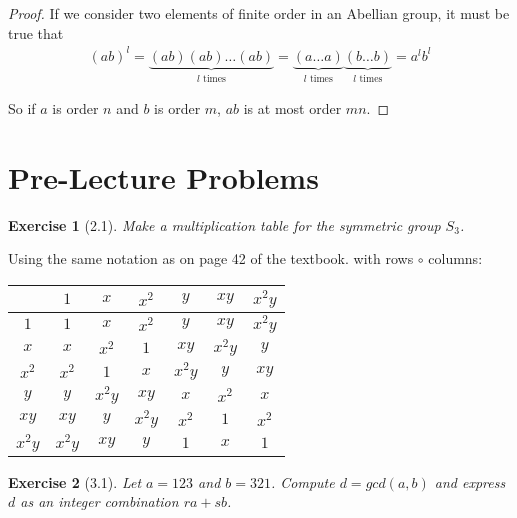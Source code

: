 \documentclass[12pt,leqno]{article}
\numberwithin{equation}{section}
\newtheorem*{exer}{Exercise}
\theoremstyle{definition}
\begin{document}
\begin{proof}[Proof]
    If we consider two elements of finite order in an Abellian group, it must be true that 
    \begin{align*}
        (ab)^l = \underbrace{(ab)(ab) \dots (ab)}_{l \textrm{ times}} = \underbrace{(a \dots a)}_{l \textrm{ times}} \underbrace{(b \dots b)}_{l \textrm{ times}} = a^l b^l
    \end{align*}

    So if $a$ is order $n$ and $b$ is order $m$, $ab$ is at most order $mn$.

\end{proof}
\section*{Pre-Lecture Problems}
\begin{exer}[2.1] Make a multiplication table for the symmetric group $S_3$.
\end{exer}



Using the same notation as on page 42 of the textbook. with rows \(\circ\) columns:
\hfill \\

\begin{center}
\begin{tabular}{|c|c|c|c|c|c|c|}
\hline  &       $1$&        $x$&        $x^2$&      $y$ &       $xy$ &      $x^2y$  \\ 
\hline  $1$&    $1$&        $x$&        $x^2$&      $y$ &       $xy$ &      $x^2y$ \\
    \hline  $x$&    $x$&    $x^2$&  $1$&    $xy$&   $x^2y$& $y$ \\
    \hline  $x^2$&  $x^2$&  $1$&    $x$&    $x^2y$& $y$&    $xy$    \\
    \hline  $y$&    $y$&    $x^2y$& $xy$&   $x$&    $x^2$&  $x$ \\
    \hline  $xy$&   $xy$&   $y$&    $x^2y$& $x^2$&  $1$&    $x^2$   \\
    \hline  $x^2y$& $x^2y$& $xy$&   $y$&    $1$&    $x$&    $1$ \\     
\hline 
\end{tabular}
\end{center}

\begin{exer}[3.1]
Let $a=123$ and $b=321$. Compute $d=gcd(a,b)$ and express $d$ as an integer combination $ra+sb$.
\end{exer}
\end{document}
